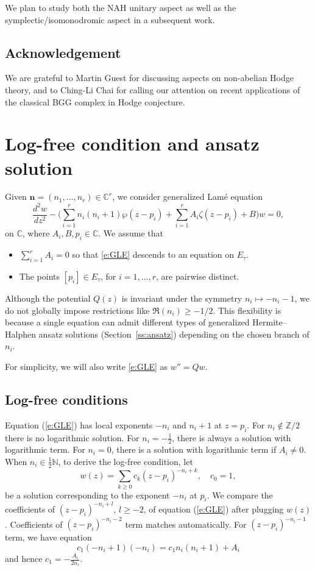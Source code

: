 \documentclass[11pt]{amsart}
\theoremstyle{remark}
\numberwithin{equation}{section}
\begin{document}
\medskip

We plan to study both the NAH unitary aspect as well as the symplectic/isomonodromic aspect in a subsequent work.

\subsection*{Acknowledgement} We are grateful to Martin Guest for discussing aspects on non-abelian Hodge theory, and to Ching-Li Chai for calling our attention on recent applications of the classical BGG complex in Hodge conjecture.   




\section{Log-free condition and ansatz solution}
Given $\mathbf{n}=(n_1,\dots,n_r)\in \mathbb{C}^r $, we consider generalized Lam\'e equation 
\begin{equation} \label{e:GLE}
 \frac{d^2 w}{d z^2} - \Big( \sum_{i=1}^{r} n_i(n_i + 1) \wp(z - p_i) + \sum_{i=1}^{r} A_i \zeta(z - p_i) +B   \Big) w =0,
\end{equation}
on $\mathbb{C}$, where $A_i,B, p_i \in \mathbb{C}$. We assume that 
\begin{itemize}
\item[(i)] $\sum_{i=1}^r A_i=0$ so that \eqref{e:GLE} descends to an equation on $E_{\tau}$.
\item[(ii)] The points $[p_i] \in E_\tau$, for $i = 1, \dots, r$, are pairwise distinct. 
\end{itemize}
Although the potential $Q(z)$ is invariant under the symmetry $n_i \mapsto -n_i-1$, we do not globally impose restrictions like $\Re(n_i) \geq -1/2$. This flexibility is because a single equation can admit different types of generalized Hermite--Halphen ansatz solutions (Section~\ref{ss:ansatz}) depending on the chosen branch of $n_i$.

For simplicity, we will also write \eqref{e:GLE} as 
$
w'' = Qw.
$


\subsection{Log-free conditions}
Equation (\ref{e:GLE}) has local exponents $-n_i$ and $n_i + 1$ at $z = p_i$.  
For $n_i \notin \mathbb{Z}/2$ there is no logarithmic solution. For $n_i = -\frac{1}{2}$, there is always a solution with logarithmic term. For $n_i =0$, there is a solution with logarithmic term if $A_i \neq 0$. 
When $n_i \in \tfrac{1}{2}\mathbb{N}$, to derive the log-free condition, let
\[
w(z) = \sum_{k \geq 0} c_k (z-p_i)^{-n_i +k}, \quad c_0 = 1,
\]
be a solution corresponding to the exponent $-n_i$ at $p_i$. We compare the coefficients of $(z - p_i)^{-n_i + l}$, $l \ge -2$, of equation (\ref{e:GLE}) after plugging $w(z)$. Coefficients of $(z - p_i)^{-n_i - 2}$ term matches automatically. For $(z-p_i)^{-n_i - 1}$ term, we have equation
\[
c_1(-n_i +1)(-n_i) = c_1n_i(n_i + 1) + A_i
\]
and hence $c_1=-\frac{A_i}{2n_i}$.
\end{document}

